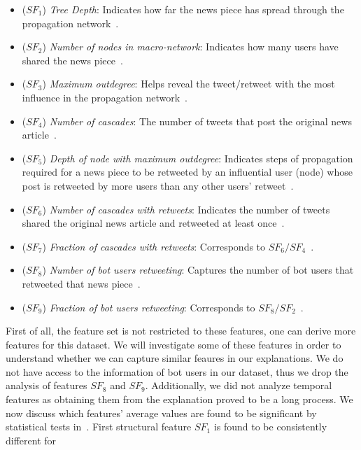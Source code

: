 \begin{itemize}
    \item ($SF_1$) \emph{Tree Depth}: Indicates how far the news piece has spread through the propagation network~\parencite{HierarchicalPropagationNetworksForFND_Shu}.
    \item ($SF_2$) \emph{Number of nodes in macro-network}: Indicates how many users have shared the news piece~\parencite{HierarchicalPropagationNetworksForFND_Shu}.
    \item ($SF_3$) \emph{Maximum outdegree}: Helps reveal the tweet/retweet with the most influence in the propagation network~\parencite{HierarchicalPropagationNetworksForFND_Shu}.
    \item ($SF_4$) \emph{Number of cascades}: The number of tweets that post the original news article~\parencite{HierarchicalPropagationNetworksForFND_Shu}.
    \item ($SF_5$) \emph{Depth of node with maximum outdegree}: Indicates steps of propagation required for a news piece to be retweeted by an influential user (node) whose post is retweeted by more users than any other users' retweet~\parencite{HierarchicalPropagationNetworksForFND_Shu}.
    \item ($SF_6$) \emph{Number of cascades with retweets}: Indicates the number of tweets shared the original news article and retweeted at least once~\parencite{HierarchicalPropagationNetworksForFND_Shu}.
    \item ($SF_7$) \emph{Fraction of cascades with retweets}: Corresponds to $SF_6 / SF_4$~\parencite{HierarchicalPropagationNetworksForFND_Shu}.
    \item ($SF_8$) \emph{Number of bot users retweeting}: Captures the number of bot users that retweeted that news piece~\parencite{HierarchicalPropagationNetworksForFND_Shu}.
    \item ($SF_9$) \emph{Fraction of bot users retweeting}: Corresponds to $SF_8 / SF_2$~\parencite{HierarchicalPropagationNetworksForFND_Shu}.
\end{itemize}
First of all, the feature set is not restricted to these features, one can derive more features for this dataset. We
will investigate some of these features in order to understand whether we can capture similar feaures in our explanations.
We do not have access to the information of bot users in our dataset, thus we drop the analysis of features $SF_8$ and $SF_9$. Additionally, we did not analyze temporal features as obtaining them from the explanation proved to be a long process. We now discuss which features' average values are found to be significant by statistical tests in~\cite{HierarchicalPropagationNetworksForFND_Shu}. First structural feature $SF_1$ is found to be consistently different for
